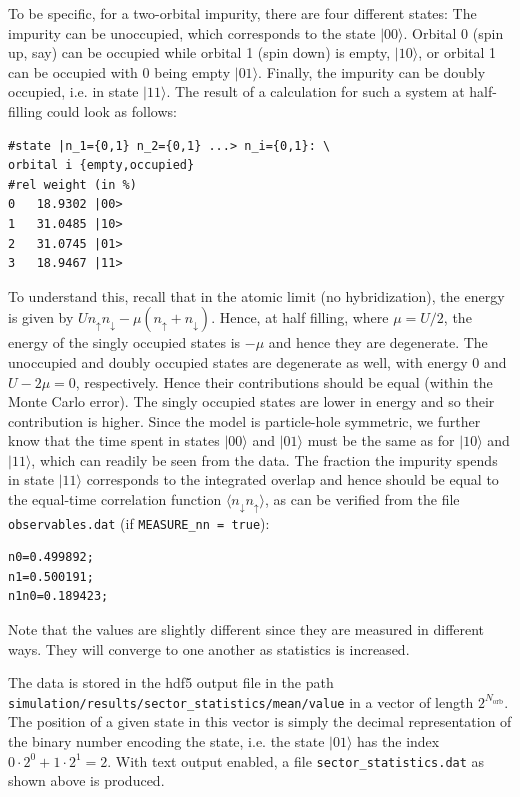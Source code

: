 \documentclass[aps,prb,floatfix,superscriptaddress,twocolumn,notitlepage]{revtex4-1}
\begin{document}
To be specific, for a two-orbital impurity, there are four different states: The impurity can be unoccupied, which corresponds to the state $|00\rangle$. Orbital 0 (spin up, say) can be occupied while orbital 1 (spin down) is empty, $|10\rangle$, or orbital 1 can be occupied with 0 being empty $|01\rangle$. Finally, the impurity can be doubly occupied, i.e. in state $|11\rangle$.
The result of a calculation for such a system at half-filling could look as follows:
\begin{verbatim}
#state |n_1={0,1} n_2={0,1} ...> n_i={0,1}: \
orbital i {empty,occupied}
#rel weight (in %)
0	18.9302	|00>
1	31.0485	|10>
2	31.0745	|01>
3	18.9467	|11>
\end{verbatim}
To understand this, recall that in the atomic limit (no hybridization), the energy is given by $Un_{\uparrow}n_{\downarrow}-\mu(n_{\uparrow}+n_{\downarrow})$. Hence, at half filling, where $\mu=U/2$, the energy of the singly occupied states is $-\mu$ and hence they are degenerate. The unoccupied and doubly occupied states are degenerate as well, with energy $0$ and $U-2\mu=0$, respectively. Hence their contributions should be equal (within the Monte Carlo error).
The singly occupied states are lower in energy and so their contribution is higher.
Since the model is particle-hole symmetric, we further know that the time spent in states $|00\rangle$ and $|01\rangle$ must be the same as for $|10\rangle$ and $|11\rangle$, which can readily be seen from the data.
The fraction the impurity spends in state $|11\rangle$ corresponds to the integrated overlap and hence should be equal to the equal-time correlation function $\langle n_{\downarrow}n_{\uparrow}\rangle$, as can be verified from the file \verb#observables.dat# (if \verb#MEASURE_nn = true#):
\begin{verbatim}
n0=0.499892;
n1=0.500191;
n1n0=0.189423;
\end{verbatim}
Note that the values are slightly different since they are measured in different ways. They will converge to one another as statistics is increased.

The data is stored in the hdf5 output file in the path \verb#simulation/results/sector_statistics/mean/value# in a vector of length $2^{N_{\text{orb}}}$.
The position of a given state in this vector is simply the decimal representation of the binary number encoding the state, i.e. the state $|01\rangle$ has the index $0\cdot 2^{0} + 1\cdot 2^{1}=2$. With text output enabled, a file \verb#sector_statistics.dat# as shown above is produced.
\end{document}
